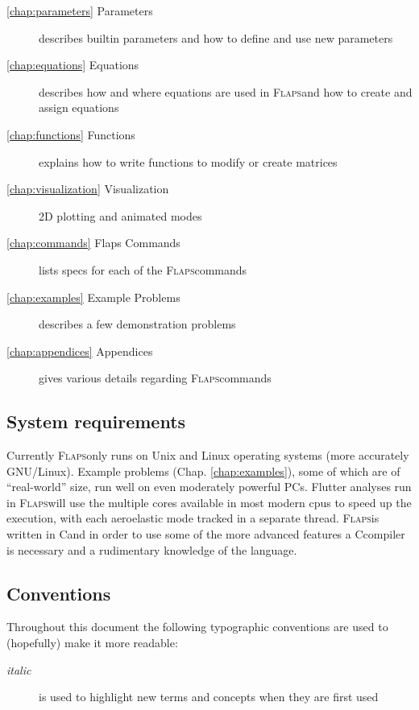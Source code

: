 \documentclass[11pt,openany,twoside]{book}
\numberwithin{equation}{section}		%
\def\Cpp{{C\nolinebreak[4]\hspace{-.05em}\raisebox{.4ex}{\tiny\bf ++}}\:}
\newcommand{\Newterm}[1]{{\em #1}}	%
\newcommand{\Flaps}{\textsc{Flaps\:}}
\newcommand{\Chapref}[1]{Chap. \ref{#1}}
\begin{document}
{\begin{description}
	\item[\ref{chap:parameters} Parameters]
	describes builtin parameters and how to define and use new parameters

	\item[\ref{chap:equations} Equations]
	describes how and where equations are used in \Flaps and
	how to create and assign equations

	\item[\ref{chap:functions} Functions]
	explains how to write functions to modify or create matrices

	\item[\ref{chap:visualization} Visualization]
	2D plotting and animated modes

	\item[\ref{chap:commands} Flaps Commands]
	lists specs for each of the \Flaps commands

	\item[\ref{chap:examples} Example Problems]
	describes a few demonstration problems

	\item[\ref{chap:appendices} Appendices]
	gives various details regarding \Flaps commands
                
\end{description}
        
\subsection{System requirements}
Currently \Flaps only runs on Unix and Linux operating systems
(more accurately GNU/Linux). Example problems (\Chapref{chap:examples}),
some of which are of ``real-world'' size, run well on even moderately
powerful PCs.
Flutter analyses run in \Flaps will use the multiple cores available
in most modern cpus to speed up the execution, with each aeroelastic
mode tracked in a separate thread.
\Flaps is written in \Cpp and in order to use some of the more advanced
features a \Cpp compiler is necessary and a rudimentary knowledge of
the language.

\subsection{Conventions}
Throughout this document the following typographic conventions
are used to (hopefully) make it more readable:

\begin{description}
	\item[\Newterm{italic}]
		is used to highlight new terms and concepts
		when they are first used
                

\end{description}}
\end{document}
